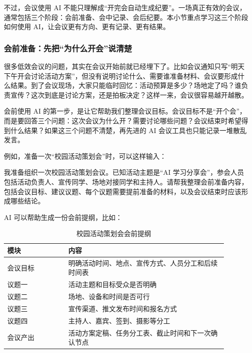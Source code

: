 
不过，会议使用 AI 不能只理解成“开完会自动生成纪要”。一场真正有效的会议，通常包括三个阶段：会前准备、会中记录、会后纪要。本小节重点学习这三个阶段如何使用 AI，让会议更有方向、更有记录、更有结果。

\subsubsection*{会前准备：先把“为什么开会”说清楚}

很多低效会议的问题，其实在会议开始前就已经埋下了。比如会议通知只写“明天下午开会讨论活动方案”，但没有说明讨论什么、需要谁准备材料、会议要形成什么结果。到了会议现场，大家只能临时回忆：活动预算是多少？场地定了吗？谁负责宣传？这次到底是讨论方案，还是拍板决定？这样一来，会议很容易越开越散。

会前使用 AI 的第一步，是让它帮助我们整理会议目标。会议目标不是“开个会”，而是要回答三个问题：这次会议为什么开？需要讨论哪些问题？会议结束时希望得到什么结果？如果这三个问题不清楚，再先进的 AI 会议工具也只能记录一堆散乱发言。

例如，准备一次“校园活动策划会”时，可以这样输入：

\begin{tcolorbox}[promptbox]
我准备组织一次校园活动策划会议。已知活动主题是“AI 学习分享会”，参会人员包括活动负责人、宣传同学、场地对接同学和主持人。请帮我整理会前准备内容，包括会议目标、建议议题、每个议题需要提前准备的材料，以及会议结束时应该形成哪些结论。
\end{tcolorbox}

AI 可以帮助生成一份会前提纲，比如：

\begin{table}[H]
\centering
\caption{校园活动策划会会前提纲}
\label{tab:meeting-pre-outline}
\begin{tabular}{p{0.25\linewidth} p{0.65\linewidth}}
\toprule
\textbf{模块} & \textbf{内容} \\
\midrule
会议目标 & 明确活动时间、地点、宣传方式、人员分工和后续时间表 \\
议题一 & 活动主题和目标受众是否明确 \\
议题二 & 场地、设备和时间是否可行 \\
议题三 & 宣传渠道、推文发布时间和报名方式 \\
议题四 & 主持人、嘉宾、签到、摄影等分工 \\
会议产出 & 活动方案定稿、任务分工表、截止时间和下一次确认节点 \\
\bottomrule
\end{tabular}
\end{table}

